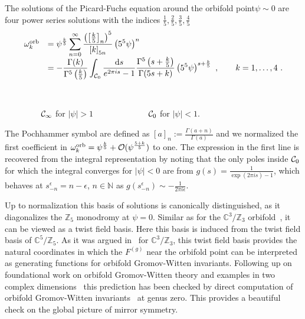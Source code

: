 \documentclass[12pt]{article}
\newcommand{\ds}{\displaystyle}
\def\dd{\mathrm{d}}
\def\eps{\epsilon}
\begin{document}
The solutions of the  Picard-Fuchs equation around the orbifold point$\psi\sim 0$
are four power series solutions with the indices
$\frac{1}{5},\frac{2}{5},\frac{3}{5},\frac{4}{5}$
\begin{equation}
\begin{array}{rl}
\omega_{k}^{\rm orb}&=\ds{\psi^{\frac{k}{5}}\sum_{n=0}^\infty
\frac{\left(\left[\frac{k}{5}\right]_n\right)^5}{\left[k\right]_{5 n}}\left(5^5 \psi\right)^n} \\[2 mm]
&=\ds{-\frac{\Gamma(k)}{\Gamma^5\left(\frac{k}{5}\right)}\int_{{\cal
C}_0} \frac{\dd s}{e^{2 \pi i s}-1}
\frac{\Gamma^5\left(s+\frac{k}{5}\right)}{\Gamma(5 s+k)}
\left(5^5 \psi\right)^{s+\frac{k}{5}} \ , \qquad k=1,\ldots, 4}\ .
\label{orbifoldbasis}
\end{array}
\end{equation}
\parbox{14cm} %
{

   \begin{center}
   \mbox{
}
   \end{center}
}
%
\vskip -2mm
\centerline{ $\qquad\qquad$ ${\cal C}_\infty$ for $|\psi|> 1$ $\qquad\qquad\qquad$ ${\cal C}_0$ for $|\psi|< 1$.}
\vskip 2mm

The Pochhammer symbol are defined as $[a]_n:=\frac{\Gamma(a+n)}{\Gamma(a)}$ and we
normalized the first coefficient in  $\omega_{k}^{\rm orb}= \psi^\frac{k}{5}+{\cal O}(\psi^\frac{5+k}{5})$
to one.  The expression in the first line is recovered from the integral representation
by noting that the only poles inside ${\cal C}_0$ for which the integral
converges for $|\psi|<0$ are from $g(s)=\frac{1}{\exp(2 \pi i s)-1}$, which behaves
at $s^\eps_{-n}=n-\epsilon$, $n\in \mathbb{N}$ as $g(s^\eps_{-n})\sim-\frac{1}{2\pi i \epsilon}$.

Up to normalization this basis of solutions is canonically
distinguished, as it diagonalizes the $\mathbb{Z}_5$ monodromy at
$\psi=0$. Similar as for the $\mathbb{C}^3/\mathbb{Z}_3$
orbifold~\cite{Aganagic:2006wq}, it can be viewed as a twist field
basis. Here this basis is induced from the twist field basis of
$\mathbb{C}^5/\mathbb{Z}_5$. As it was argued
in~\cite{Aganagic:2006wq} for $\mathbb{C}^3/\mathbb{Z}_3$, this
twist field basis provides the natural coordinates in which the
$F^{(g)}$ near the orbifold point can be interpreted as generating
functions for orbifold Gromov-Witten invariants. Following up on
foundational work on orbifold Gromov-Witten theory \cite{CR} and
examples in two complex dimensions~\cite{BGP} this prediction has
been checked by direct computation of orbifold  Gromov-Witten
invariants~\cite{CCIT} at genus zero. This provides a beautiful
check on the global picture of mirror symmetry.
\end{document}
